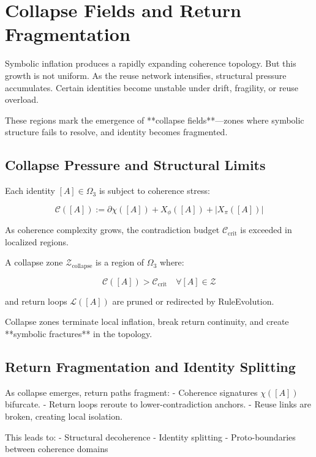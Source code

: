 \chapter{Collapse Fields and Return Fragmentation} \label{chapter:collapse-fragmentation}

Symbolic inflation produces a rapidly expanding coherence topology. But this growth is not uniform. As the reuse network intensifies, structural pressure accumulates. Certain identities become unstable under drift, fragility, or reuse overload.

These regions mark the emergence of **collapse fields**—zones where symbolic structure fails to resolve, and identity becomes fragmented.

\section{Collapse Pressure and Structural Limits}

Each identity $[A] \in \Omega_3$ is subject to coherence stress:

\[
\mathcal{C}([A]) := \partial \chi([A]) + X_\phi([A]) + |X_\pi([A])|
\]

As coherence complexity grows, the contradiction budget $\mathcal{C}_{\text{crit}}$ is exceeded in localized regions.

\begin{definition}
A collapse zone $\mathcal{Z}_{\text{collapse}}$ is a region of $\Omega_3$ where:

\[
\mathcal{C}([A]) > \mathcal{C}_{\text{crit}} \quad \forall [A] \in \mathcal{Z}
\]

and return loops $\mathcal{L}([A])$ are pruned or redirected by RuleEvolution.
\end{definition}

Collapse zones terminate local inflation, break return continuity, and create **symbolic fractures** in the topology.

\section{Return Fragmentation and Identity Splitting}

As collapse emerges, return paths fragment:
- Coherence signatures $\chi([A])$ bifurcate.
- Return loops reroute to lower-contradiction anchors.
- Reuse links are broken, creating local isolation.

This leads to:
- Structural decoherence
- Identity splitting
- Proto-boundaries between coherence domains

